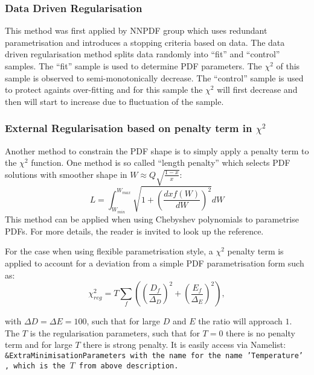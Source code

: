 \subsubsection{Data Driven Regularisation}
This method was first applied by NNPDF group which uses redundant parametrisation and introduces a stopping criteria based on data.
The data driven regularisation method splits data randomly into ``fit'' and ``control''  samples. The ``fit'' sample is used to determine PDF parameters. The $\chi^2$ of this sample is observed to semi-monotonically decrease. The ``control'' sample is used to protect againts over-fitting and for this sample the $\chi^2$ will first decrease and then will start to increase due to fluctuation of the sample.


\subsubsection{External Regularisation based on penalty term in $\chi^2$}

Another method to constrain the PDF shape is to simply apply a penalty term
to the $\chi^2$ function. 
One method is so called ``length penalty'' which selects PDF solutions with smoother shape in $W\approx Q\sqrt{\frac{1-x}{x}}$:
\begin{equation}
L=\int_{W_{min}}^{W_{max}} \sqrt{1+\left(\frac{dxf(W)}{dW}\right)^2}dW
\end{equation}
This method can be applied when using Chebyshev polynomials to parametrise PDFs.
For more details, the reader is invited to look up the \cite{Chebyshev} reference.

For the case when using flexible parametrisation style, 
a $\chi^2$ penalty term is applied to account for a deviation 
from a simple PDF parametrisation form such as:
\begin{equation}
\chi^2_{reg}= T\sum_f\left(\left(\frac{D_f}{\Delta_D}\right)^2+ \left(\frac{E_f}{\Delta_E}\right)^2\right),
\end{equation}

with $\Delta D=\Delta E = 100$, such that for large $D$ and $E$ the ratio will approach $1$. The $T$ is the regularisation parameters, such that for $T=0$ there is no penalty term and for large $T$ there is strong penalty.
It is easily access via Namelist: \tt \&ExtraMinimisationParameters \rm
with the name for the name \tt 'Temperature' \rm, which is the $T$ from above description.


